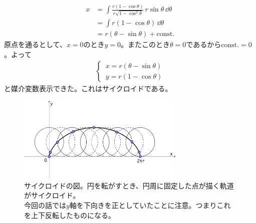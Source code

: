 \begin{align*}
  x &= \int \frac{r(1 - \cos\theta)}{r \sqrt{1 - \cos^2 \theta}}\,r\sin\theta\,\dd \theta \\
  &= \int r(1 - \cos\theta)\,\dd \theta \\
  &= r(\theta - \sin\theta) + \mathrm{const.}
\end{align*}
原点を通るとして、$x = 0$のとき$y = 0$。またこのとき$\theta = 0$であるから$\mathrm{const.} = 0$。よって
\begin{align*}
  \begin{cases}
    \, x = r(\theta - \sin\theta)\\
    \, y = r(1 - \cos\theta)
  \end{cases}
\end{align*}
と媒介変数表示できた。これはサイクロイドである。

\begin{figure}[H]
  \centering
  \includegraphics[width=8cm]{nakayama1/image/cyco}\\
  {\small サイクロイドの図。円を転がすとき、円周に固定した点が描く軌道がサイクロイド。\\
  今回の話では$y$軸を下向きを正としていたことに注意。つまりこれを上下反転したものになる。}
\end{figure}

%
\clearpage
